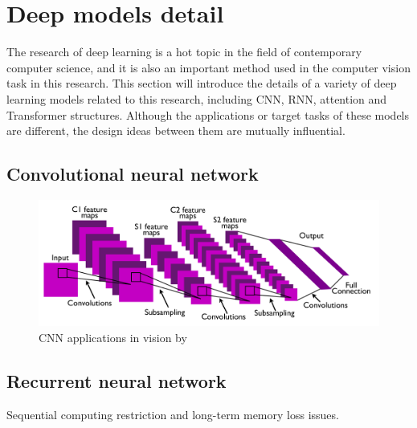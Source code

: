 \section{Deep models detail}
\label{sec:Deep models detail}
The research of deep learning is a hot topic in the field of contemporary computer science, and it is also an important method used in the computer vision task in this research.
This section will introduce the details of a variety of deep learning models related to this research, including CNN, RNN, attention and Transformer structures.
Although the applications or target tasks of these models are different, the design ideas between them are mutually influential.
\subsection{Convolutional neural network}
\citet{fukushima1980neocognitron}

\citet{zhang1988shift}

\begin{figure}[ht!]
    \centering
    \includegraphics[width=\textwidth]{literature/imgs/ext-lecun-cnn-arch.png}
    \caption{CNN applications in vision by \citet{lecun2010convolutional}}
    \label{fig:ext-lecun-cnn-arch}
\end{figure}

\citet{lecun2010convolutional}

\citet{gu2018recent}

\subsection{Recurrent neural network}
\citet{jordan1997serial}

\citet{hochreiter1997long}

\citet{sherstinsky2020fundamentals}

\citet{chung2014empirical}

Sequential computing restriction and long-term memory loss issues.

